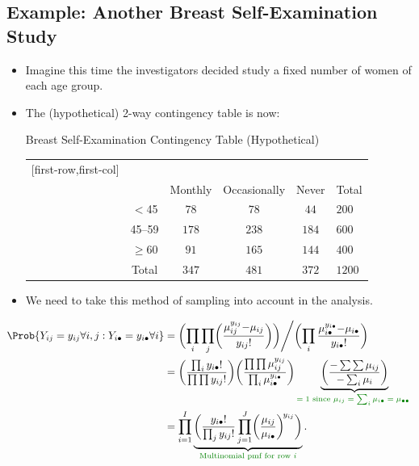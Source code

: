 \documentclass{article}\usepackage[]{graphicx}\usepackage[svgnames]{xcolor}
\providecommand\given{} %
\renewcommand\given{\nonscript\:\delimsize\vert\nonscript\:\mathopen{}}%
\renewcommand\given{\nonscript\:\delimsize\vert\nonscript\:\mathopen{}}%
\renewcommand\given{\nonscript\:\delimsize\vert\nonscript\:\mathopen{}}%
\renewcommand\given{\nonscript\:\delimsize\vert\nonscript\:\mathopen{}}%
\renewcommand\given{\nonscript\:\delimsize\vert\nonscript\:\mathopen{}}%
\renewcommand\given{\nonscript\:\delimsize\vert\nonscript\:\mathopen{}}%
\renewcommand\given{\nonscript\:\delimsize\vert\nonscript\:\mathopen{}}%
\renewcommand\given{\nonscript\:\delimsize\vert\nonscript\:\mathopen{}}%
\renewcommand\given{\nonscript\:\delimsize\vert\nonscript\:\mathopen{}}%
\renewcommand\given{\nonscript\:\delimsize\vert\nonscript\:\mathopen{}}%
\renewcommand\given{\nonscript\:\delimsize\vert\nonscript\:\mathopen{}}%
\let\exp\relax%
\renewcommand\given{:}
\begin{document}
\subsection*{Example: Another Breast Self-Examination Study}
\begin{itemize}
      \item Imagine this time the investigators decided study a fixed number of women of
            each age group.
      \item The (hypothetical) 2-way contingency table is now:
            \begin{Example}{Breast Self-Examination Contingency Table (Hypothetical)}
                  \begin{center}
                        \begin{NiceTabular}{c|ccc|c}[first-row,first-col]
                              &&\\
                              && Monthly & Occasionally & Never & Total\\
                              \midrule
                               & $<$45 & $ 78 $ & $ 78 $ & $ 44 $ & $ 200 $\\
                              & 45--59 & $ 178 $ & $ 238 $ & $ 184 $ & $ 600 $\\
                              & $ \ge $60 & $ 91 $ & $ 165 $ & $ 144 $ & $ 400 $\\
                              \midrule
                              & Total & $ 347 $ & $ 481 $ & $ 372 $ & $ 1200 $
                        \end{NiceTabular}
                  \end{center}
            \end{Example}
      \item We need to take this method of sampling into account in the analysis.
\end{itemize}
\begin{align*}
      \Prob{Y_{ij}=y_{ij}\forall i,j\given Y_{i\bullet}=y_{i\bullet}\forall i}
       & =\biggl(\prod_i \prod_j \biggl(\frac{\mu_{ij}^{y_{ij}} \exp{-\mu_{ij}}}{y_{ij}!}\biggr)\biggr)\Bigg/\biggl(\prod_i \frac{\mu_{i\bullet}^{y_{i\bullet}}\exp{-\mu_{i\bullet}}}{y_{i\bullet}!}\biggr)             \\
       & =\biggl(\frac{\prod_i y_{i\bullet}!}{\prod\prod y_{ij}!}\biggr)\biggl(\frac{\prod\prod \mu_{ij}^{y_{ij}}}{\prod_i \mu_{i\bullet}^{y_{i\bullet}}}\biggr)
      \underbrace{\biggl(\frac{\exp{-\sum\sum \mu_{ij}}}{\exp{-\sum_i \mu_i}}\biggr)}_{\textcolor{Green}{\text{$=1$ since $\mu_{i j}=\sum_i \mu_{i\bullet}=\mu_{\bullet\bullet}$ }}}                                    \\
       & =\prod_{i=1}^I \underbrace{\biggl(\frac{y_{i\bullet}!}{\prod_j y_{ij}!}\prod_{j=1}^J \biggl(\frac{\mu_{ij}}{\mu_{i\bullet}}\biggr)^{\!y_{ij}}\biggr)}_{\textcolor{Green}{\text{Multinomial pmf for row $i$}}}.
\end{align*}
\end{document}
